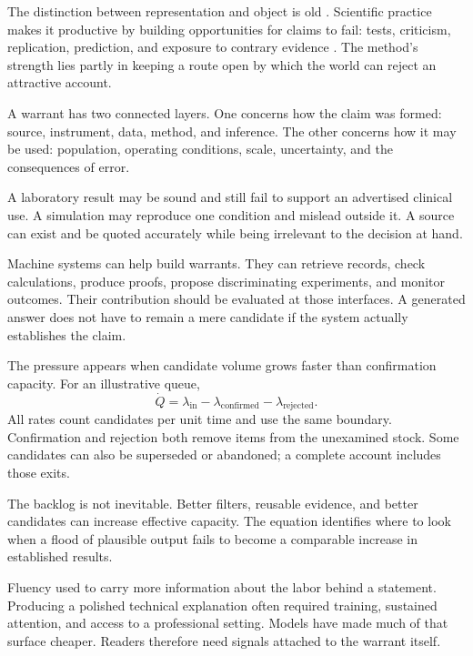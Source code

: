 \documentclass[11pt,openany]{book}
\begin{document}
The distinction between representation and object is old \cite{ogden1923meaning}. Scientific practice makes it productive by building opportunities for claims to fail: tests, criticism, replication, prediction, and exposure to contrary evidence \cite{popper1934logik}. The method's strength lies partly in keeping a route open by which the world can reject an attractive account.

A warrant has two connected layers. One concerns how the claim was formed: source, instrument, data, method, and inference. The other concerns how it may be used: population, operating conditions, scale, uncertainty, and the consequences of error.

A laboratory result may be sound and still fail to support an advertised clinical use. A simulation may reproduce one condition and mislead outside it. A source can exist and be quoted accurately while being irrelevant to the decision at hand.

Machine systems can help build warrants. They can retrieve records, check calculations, produce proofs, propose discriminating experiments, and monitor outcomes. Their contribution should be evaluated at those interfaces. A generated answer does not have to remain a mere candidate if the system actually establishes the claim.

The pressure appears when candidate volume grows faster than confirmation capacity. For an illustrative queue,
\begin{equation}
 \dot Q=\lambda_{\mathrm{in}}
        -\lambda_{\mathrm{confirmed}}
        -\lambda_{\mathrm{rejected}}.
\end{equation}
All rates count candidates per unit time and use the same boundary. Confirmation and rejection both remove items from the unexamined stock. Some candidates can also be superseded or abandoned; a complete account includes those exits.

The backlog is not inevitable. Better filters, reusable evidence, and better candidates can increase effective capacity. The equation identifies where to look when a flood of plausible output fails to become a comparable increase in established results.

Fluency used to carry more information about the labor behind a statement. Producing a polished technical explanation often required training, sustained attention, and access to a professional setting. Models have made much of that surface cheaper. Readers therefore need signals attached to the warrant itself.
\end{document}
